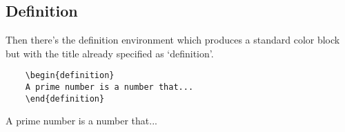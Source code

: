 \subsection{Definition}
Then there’s the definition environment which produces a standard color block but with the title already specified as ‘definition’.
    \begin{verbatim}
    \begin{definition}
    A prime number is a number that...
    \end{definition}
    \end{verbatim}
\begin{defn}
    A prime number is a number that...
\end{defn}
